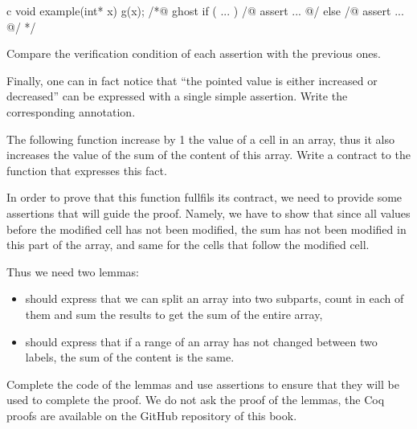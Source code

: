 \begin{CodeBlock}{c}
void example(int* x){
  g(x);
  /*@ ghost
   if ( ... ){
    /@ assert ... @/
   } else {
    /@ assert ... @/
   }
  */
}
\end{CodeBlock}

Compare the verification condition of each assertion with the previous ones.

Finally, one can in fact notice that ``the pointed value is either increased
or decreased'' can be expressed with a single simple assertion. Write the
corresponding annotation.



\label{l4:proof-methodologies-triggering-lemmas-exercises-sum}


The following function increase by 1 the value of a cell in an array, thus it
also increases the value of the sum of the content of this array. Write a
contract to the function that expresses this fact.




In order to prove that this function fullfils its contract, we need to provide
some assertions that will guide the proof. Namely, we have to show that since
all values before the modified cell has not been modified, the sum has not been
modified in this part of the array, and same for the cells that follow the
modified cell.


Thus we need two lemmas:

\begin{itemize}
\item {} should express that we can split an array into
  two subparts, count in each of them and sum the results to get the sum of the
  entire array,
\item {} should express that if a range of an array has
  not changed between two labels, the sum of the content is the same.
\end{itemize}

Complete the code of the lemmas and use assertions to ensure that they will be
used to complete the proof. We do not ask the proof of the lemmas, the Coq
proofs are available on the GitHub repository of this book.
